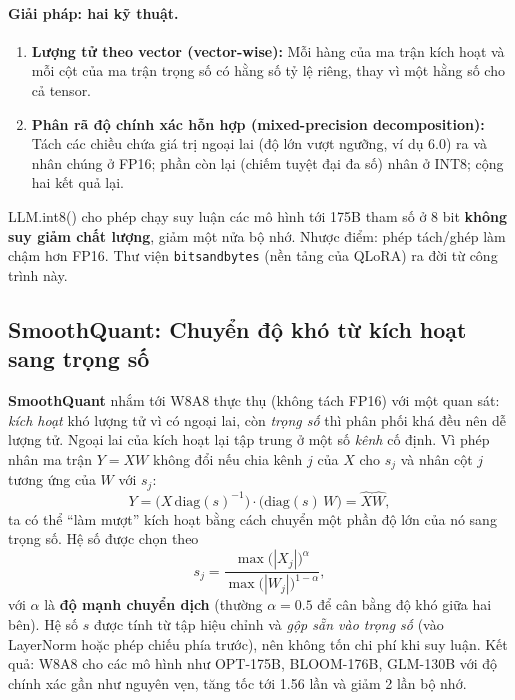 \paragraph{Giải pháp: hai kỹ thuật.}
\begin{enumerate}
	\item \textbf{Lượng tử theo vector (vector-wise):} Mỗi hàng của ma trận kích hoạt và mỗi cột của ma trận trọng số có hằng số tỷ lệ riêng, thay vì một hằng số cho cả tensor.
	\item \textbf{Phân rã độ chính xác hỗn hợp (mixed-precision decomposition):} Tách các chiều chứa giá trị ngoại lai (độ lớn vượt ngưỡng, ví dụ 6.0) ra và nhân chúng ở FP16; phần còn lại (chiếm tuyệt đại đa số) nhân ở INT8; cộng hai kết quả lại.
\end{enumerate}
LLM.int8() cho phép chạy suy luận các mô hình tới 175B tham số ở 8 bit \textbf{không suy giảm chất lượng}, giảm một nửa bộ nhớ. Nhược điểm: phép tách/ghép làm chậm hơn FP16. Thư viện \texttt{bitsandbytes} (nền tảng của QLoRA) ra đời từ công trình này.

\subsection{SmoothQuant: Chuyển độ khó từ kích hoạt sang trọng số}
\label{ssec:smoothquant}
\textbf{SmoothQuant} \cite{xiao2023smoothquant} nhắm tới W8A8 thực thụ (không tách FP16) với một quan sát: \emph{kích hoạt} khó lượng tử vì có ngoại lai, còn \emph{trọng số} thì phân phối khá đều nên dễ lượng tử. Ngoại lai của kích hoạt lại tập trung ở một số \emph{kênh} cố định. Vì phép nhân ma trận $Y = XW$ không đổi nếu chia kênh $j$ của $X$ cho $s_j$ và nhân cột $j$ tương ứng của $W$ với $s_j$:
\[
Y = \big(X\,\text{diag}(s)^{-1}\big)\cdot\big(\text{diag}(s)\,W\big) = \hat{X}\hat{W},
\]
ta có thể “làm mượt” kích hoạt bằng cách chuyển một phần độ lớn của nó sang trọng số. Hệ số được chọn theo
\[
s_j = \frac{\max\big(|X_j|\big)^{\alpha}}{\max\big(|W_j|\big)^{1-\alpha}},
\]
với $\alpha$ là \textbf{độ mạnh chuyển dịch} (thường $\alpha = 0.5$ để cân bằng độ khó giữa hai bên). Hệ số $s$ được tính từ tập hiệu chỉnh và \emph{gộp sẵn vào trọng số} (vào LayerNorm hoặc phép chiếu phía trước), nên không tốn chi phí khi suy luận. Kết quả: W8A8 cho các mô hình như OPT-175B, BLOOM-176B, GLM-130B với độ chính xác gần như nguyên vẹn, tăng tốc tới 1.56 lần và giảm 2 lần bộ nhớ.

\begin{center}
\label{fig:smoothquant}
\end{center}

